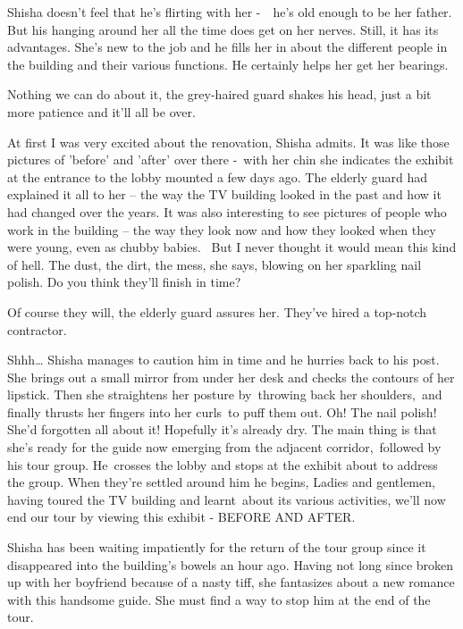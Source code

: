 \documentclass[letterpaper]{article}
\begin{document}
Shisha doesn't feel that he's flirting with her -\ \ he's old enough to be her father. But his hanging around her all
the time does get on her nerves. Still, it has its advantages. She's new to the job and he fills her in about the
different people in the building and their various functions. He certainly helps her get her bearings.\ 

{\textquotedbl}Nothing we can do about it,{\textquotedbl} the grey-haired guard shakes his head, {\textquotedbl}just a
bit more patience and it'll all be over.{\textquotedbl} ~

{\textquotedbl}At first I was very excited about the renovation,{\textquotedbl} Shisha admits. {\textquotedbl}It was
like those pictures of 'before' and 'after' over there -{\textquotedbl}~with her chin she indicates the exhibit at the
entrance to the lobby mounted a few days ago. The elderly guard had explained it all to her -- the way the TV building
looked in the past and how it had changed over the years. It was also interesting to see pictures of people who work in
the building -- the way they look now and how they looked when they were young, even as chubby babies.
~{\textquotedbl}But I never thought it would mean this kind of hell. The dust, the dirt, the mess,{\textquotedbl} she
says, blowing on her sparkling nail polish. {\textquotedbl}Do you think they'll finish in time?{\textquotedbl} 

{\textquotedbl}Of course they will,{\textquotedbl} the elderly guard assures her. {\textquotedbl}They've hired a
top-notch contractor.{\textquotedbl}

{\textquotedbl}Shhh{\dots}{\textquotedbl} Shisha manages to caution him in time and he hurries back to his post. She
brings out a small mirror from under her desk and checks the contours of her lipstick. Then she straightens her posture
by\textcolor{red}{\ }throwing back her shoulders,\ and finally thrusts her fingers into her curls~to puff them out. Oh!
The nail polish! She'd forgotten all about it! Hopefully it's already dry. The main thing is that she's ready for the
guide now emerging from the adjacent corridor,~followed by his tour group. He~crosses the lobby and stops at the
exhibit about to address the group. When they're settled around him he begins, {\textquotedbl}Ladies and gentlemen,
having toured the TV building and learnt\ about its various activities, we'll now end our tour by viewing this exhibit
- BEFORE AND AFTER.{\textquotedbl}\ 

Shisha has been waiting impatiently for the return of the tour group since it disappeared into the building's bowels an
hour ago. Having not long since broken up with her boyfriend because of a nasty tiff, she fantasizes about a new
romance with this handsome guide. She must find a way to stop him at the end of the tour. 
\end{document}
